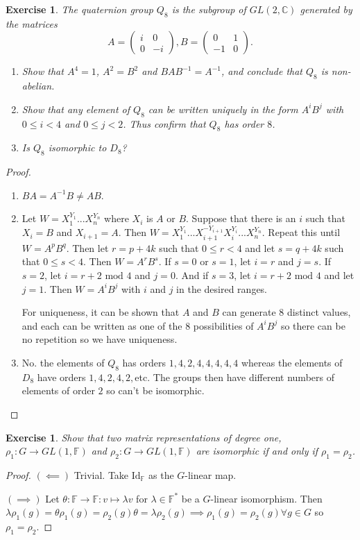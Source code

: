 \documentclass{article}
\newtheorem{exercise}[theorem]{Exercise}
\begin{document}
\begin{exercise}
The quaternion group $Q_8$ is the subgroup of $GL(2,\mathbb{C})$ generated by the matrices\[A=\begin{pmatrix}
  i & 0\\ 
  0 & -i
\end{pmatrix},   B=\begin{pmatrix}
  0 & 1\\ 
  -1 & 0
\end{pmatrix}.\]
\begin{enumerate}[label=(\roman*)]
    \item Show that $A^4=1$, $A^2=B^2$ and $BAB^{-1}=A^{-1}$, and conclude that $Q_8$ is non-abelian.
    \item Show that any element of $Q_8$ can be written uniquely in the form $A^iB^j$ with $0\leq i<4$ and $0\leq j<2$. Thus confirm that $Q_8$ has order $8$.
    \item Is $Q_8$ isomorphic to $D_8$?
\end{enumerate}
\end{exercise}
\begin{proof}
\begin{enumerate}[label=(\roman*)]
    \item $BA=A^{-1}B\neq AB$.
    \item Let $W=X_1^{Y_1}...X_n^{Y_n}$ where $X_i$ is $A$ or $B$. Suppose that there is an $i$ such that $X_i=B$ and $X_{i+1}=A$. Then $W=X_1^{Y_1}...X_{i+1}^{-Y_{i+1}}X_i^{Y_i}...X_n^{Y_n}$. Repeat this until $W=A^pB^q$. Then let $r=p+4k$ such that $0\leq r<4$ and let $s=q+4k$ such that $0\leq s<4$. Then $W=A^rB^s$. If $s=0$ or $s=1$, let $i=r$ and $j=s$. If $s=2$, let $i=r+2\text{ mod }4$ and $j=0$. And if $s=3$, let $i=r+2\text{ mod }4$ and let $j=1$. Then $W=A^iB^j$ with $i$ and $j$ in the desired ranges.

    For uniqueness, it can be shown that $A$ and $B$ can generate $8$ distinct values, and each can be written as one of the $8$ possibilities of $A^iB^j$ so there can be no repetition so we have uniqueness.
    \item No. the elements of $Q_8$ has orders $1,4,2,4,4,4,4,4$ whereas the elements of $D_8$ have orders $1,4,2,4,2,$etc. The groups then have different numbers of elements of order $2$ so can't be isomorphic.
\end{enumerate}
\end{proof}

\begin{exercise}
Show that two matrix representations of degree one, $\rho_1:G\to GL(1,\mathbb{F})$ and $\rho_2:G\to GL(1,\mathbb{F})$ are isomorphic if and only if $\rho_1=\rho_2$.
\end{exercise}
\begin{proof}
$(\impliedby)$ Trivial. Take $\text{Id}_{\mathbb{F}}$ as the $G$-linear map.

$(\implies)$ Let $\theta:\mathbb{F}\to\mathbb{F}:v\mapsto\lambda v$ for $\lambda\in\mathbb{F}^*$ be a $G$-linear isomorphism. Then $\lambda\rho_1(g)=\theta\rho_1(g)=\rho_2(g)\theta=\lambda\rho_2(g)\implies\rho_1(g)=\rho_2(g)\forall g\in G$ so $\rho_1=\rho_2$.
\end{proof}
\end{document}

